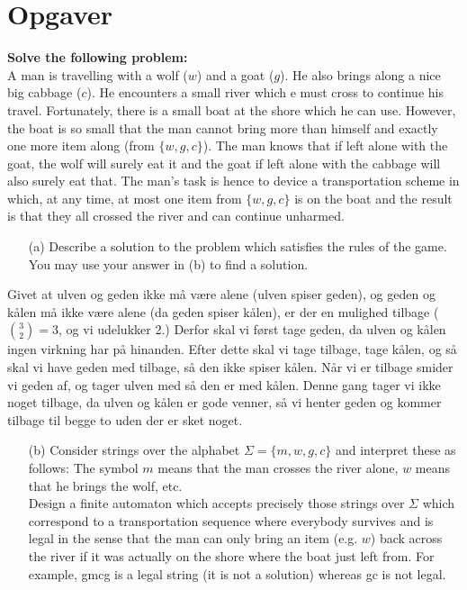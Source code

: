 \newpage
\section{Opgaver}

\noindent
\textbf{Solve the following problem:} \\
\noindent
A man is travelling with a wolf ($w$) and a goat ($g$). He also brings along a nice big cabbage ($c$). He encounters a small river which e must cross to continue his travel. Fortunately, there is a small boat at the shore which he can use. However, the boat is so small that the man cannot bring more than himself and exactly one more item along (from $\{w, g, c\}$). The man knows that if left alone with the goat, the wolf will surely eat it and the goat if left alone with the cabbage will also surely eat that. The man's task is hence to device a transportation scheme in which, at any time, at most one item from $\{w,g,c\}$ is on the boat and the result is that they all crossed the river and can continue unharmed.

\begin{enumerate}
  \item[(a)] Describe a solution to the problem which satisfies the rules of the game. You may use your answer in (b) to find a solution.
\end{enumerate}

Givet at ulven og geden ikke må være alene (ulven spiser geden), og geden og kålen må ikke være alene (da geden spiser kålen), er der en mulighed tilbage ($\binom{3}{2} = 3$, og vi udelukker 2.) Derfor skal vi først tage geden, da ulven og kålen ingen virkning har på hinanden. Efter dette skal vi tage tilbage, tage kålen, og så skal vi have geden med tilbage, så den ikke spiser kålen. Når vi er tilbage smider vi geden af, og tager ulven med så den er med kålen. Denne gang tager vi ikke noget tilbage, da ulven og kålen er gode venner, så vi henter geden og kommer tilbage til begge to uden der er sket noget.

\begin{enumerate}
\item [(b)] Consider strings over the alphabet $\Sigma = \{m, w, g, c\}$ and interpret these as follows: The symbol $m$ means that the man crosses the river alone, $w$ means that he brings the wolf, etc. \\ Design a finite automaton which accepts precisely those strings over $\Sigma$ which correspond to a transportation sequence where everybody survives and is legal in the sense that the man can only bring an item (e.g. $w$) back across the river if it was actually on the shore where the boat just left from. For example, gmcg is a legal string (it is not a solution) whereas gc is not legal.
\end{enumerate}




